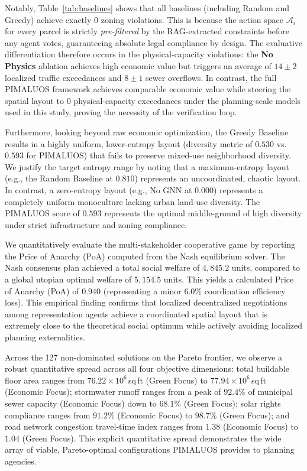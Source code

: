 \documentclass[final,3p,times]{elsarticle}
\begin{document}
Notably, Table~\ref{tab:baselines} shows that all baselines (including Random and Greedy) achieve exactly $0$ zoning violations. This is because the action space $\mathcal{A}_i$ for every parcel is strictly \textit{pre-filtered} by the RAG-extracted constraints before any agent votes, guaranteeing absolute legal compliance by design. The evaluative differentiation therefore occurs in the physical-capacity violations: the \textbf{No Physics} ablation achieves high economic value but triggers an average of $14 \pm 2$ localized traffic exceedances and $8 \pm 1$ sewer overflows. In contrast, the full PIMALUOS framework achieves comparable economic value while steering the spatial layout to $0$ physical-capacity exceedances under the planning-scale models used in this study, proving the necessity of the verification loop.

Furthermore, looking beyond raw economic optimization, the Greedy Baseline results in a highly uniform, lower-entropy layout (diversity metric of $0.530$ vs. $0.593$ for PIMALUOS) that fails to preserve mixed-use neighborhood diversity. We justify the target entropy range by noting that a maximum-entropy layout (e.g., the Random Baseline at $0.810$) represents an uncoordinated, chaotic layout. In contrast, a zero-entropy layout (e.g., No GNN at $0.000$) represents a completely uniform monoculture lacking urban land-use diversity. The PIMALUOS score of $0.593$ represents the optimal middle-ground of high diversity under strict infrastructure and zoning compliance.

We quantitatively evaluate the multi-stakeholder cooperative game by reporting the Price of Anarchy (PoA) computed from the Nash equilibrium solver. The Nash consensus plan achieved a total social welfare of $4,845.2$ units, compared to a global utopian optimal welfare of $5,154.5$ units. This yields a calculated Price of Anarchy (PoA) of $0.940$ (representing a minor $6.0\%$ coordination efficiency loss). This empirical finding confirms that localized decentralized negotiations among representation agents achieve a coordinated spatial layout that is extremely close to the theoretical social optimum while actively avoiding localized planning externalities.

Across the 127 non-dominated solutions on the Pareto frontier, we observe a robust quantitative spread across all four objective dimensions: total buildable floor area ranges from $76.22 \times 10^6$\,sq\,ft (Green Focus) to $77.94 \times 10^6$\,sq\,ft (Economic Focus); stormwater runoff ranges from a peak of $92.4\%$ of municipal sewer capacity (Economic Focus) down to $68.1\%$ (Green Focus); solar rights compliance ranges from $91.2\%$ (Economic Focus) to $98.7\%$ (Green Focus); and road network congestion travel-time index ranges from $1.38$ (Economic Focus) to $1.04$ (Green Focus). This explicit quantitative spread demonstrates the wide array of viable, Pareto-optimal configurations PIMALUOS provides to planning agencies.
\end{document}
